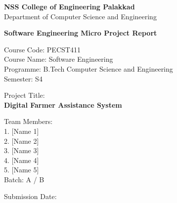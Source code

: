\thispagestyle{empty}
\begin{center}
\vspace*{1cm}
{\Large \textbf{NSS College of Engineering Palakkad}}\\
{\large Department of Computer Science and Engineering}

\vspace{1.5cm}

{\Large \bfseries Software Engineering Micro Project Report}

\vspace{1cm}

{\large Course Code: PECST411}\\
{\large Course Name: Software Engineering}\\
{\large Programme: B.Tech Computer Science and Engineering}\\
{\large Semester: S4}

\vspace{2cm}

{\large Project Title:}\\
\vspace{0.5cm}
{\LARGE \textbf{Digital Farmer Assistance System}}

\vspace{2cm}

{\large Team Members:}\\
\vspace{0.3cm}
1. [Name 1]\\
2. [Name 2]\\
3. [Name 3]\\
4. [Name 4]\\
5. [Name 5]\\

\vspace{1cm}
{\large Batch: A / B}

\vfill

{\large Submission Date: \underline{\hspace{4cm}}}
\end{center}
